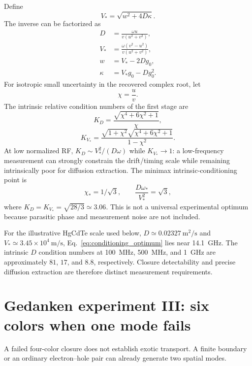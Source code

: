 \documentclass[11pt]{article}
\begin{document}
Define
\begin{equation}
V_*=\sqrt{w^2+4D\kappa}.
\end{equation}
The inverse can be factorized as
\begin{align}
D&=\boxed{\frac{\omega u}{v(u^2+v^2)}},\\
V_*&=\boxed{\frac{\omega(v^2-u^2)}{v(u^2+v^2)}},\\
w&=V_*-2Dg_0,\\
\kappa&=V_*g_0-Dg_0^2.
\end{align}
For isotropic small uncertainty in the recovered complex root, let
\begin{equation}
\chi=\frac{u}{v}.
\end{equation}
The intrinsic relative condition numbers of the first stage are
\begin{equation}
\boxed{K_D=\frac{\sqrt{\chi^4+6\chi^2+1}}{\chi},}
\end{equation}
\begin{equation}
\boxed{K_{V_*}=\frac{\sqrt{1+\chi^2}\sqrt{\chi^4+6\chi^2+1}}{1-\chi^2}.}
\end{equation}
At low normalized RF, $K_D\sim V_*^2/(D\omega)$ while $K_{V_*}\to1$: a low-frequency measurement can strongly constrain the drift/timing scale while remaining intrinsically poor for diffusion extraction. The minimax intrinsic-conditioning point is
\begin{equation}
\boxed{\chi_*=1/\sqrt3,\qquad \frac{D\omega_*}{V_*^2}=\sqrt3,}
\label{eq:conditioning_optimum}
\end{equation}
where $K_D=K_{V_*}=\sqrt{28/3}\simeq3.06$. This is not a universal experimental optimum because parasitic phase and measurement noise are not included.

For the illustrative HgCdTe scale used below, $D\simeq0.02327~\mathrm{m^2/s}$ and $V_*\simeq3.45\times10^4~\mathrm{m/s}$, Eq.~\eqref{eq:conditioning_optimum} lies near \SI{14.1}{GHz}. The intrinsic $D$ condition numbers at \SI{100}{MHz}, \SI{500}{MHz}, and \SI{1}{GHz} are approximately $81$, $17$, and $8.8$, respectively. Closure detectability and precise diffusion extraction are therefore distinct measurement requirements.

\section{Gedanken experiment III: six colors when one mode fails}

A failed four-color closure does not establish exotic transport. A finite boundary or an ordinary electron--hole pair can already generate two spatial modes.
\end{document}
